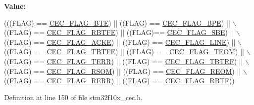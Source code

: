 {\bfseries Value\+:}
\begin{DoxyCode}
(((FLAG) == \hyperlink{group___c_e_c__flags__definition_ga66e91438a7df5d00db3c5410d8f7d456}{CEC\_FLAG\_BTE}) || ((FLAG) == \hyperlink{group___c_e_c__flags__definition_gaf2a5d5dcbc57fc0cf7cfa988533a2a09}{CEC\_FLAG\_BPE}) || \(\backslash\)
                               ((FLAG) == \hyperlink{group___c_e_c__flags__definition_gafdfca815014dee4a458083337795c336}{CEC\_FLAG\_RBTFE}) || ((FLAG)== 
      \hyperlink{group___c_e_c__flags__definition_gac77db62c05af2462ed3f1b64cef2e136}{CEC\_FLAG\_SBE}) || \(\backslash\)
                               ((FLAG) == \hyperlink{group___c_e_c__flags__definition_ga1583b7a221e54f2f19cb121bf310547c}{CEC\_FLAG\_ACKE}) || ((FLAG) == 
      \hyperlink{group___c_e_c__flags__definition_gaf751970725df12976dc6c8356910143a}{CEC\_FLAG\_LINE}) || \(\backslash\)
                               ((FLAG) == \hyperlink{group___c_e_c__flags__definition_gaae90fd2f95085e113b6943bb35d899ba}{CEC\_FLAG\_TBTFE}) || ((FLAG) == 
      \hyperlink{group___c_e_c__flags__definition_gad0adfb11294f562f2c8dc555f69e25e0}{CEC\_FLAG\_TEOM}) || \(\backslash\)
                               ((FLAG) == \hyperlink{group___c_e_c__flags__definition_ga7edc608ca7b4ea74dd4d795fa3214c11}{CEC\_FLAG\_TERR}) || ((FLAG) == 
      \hyperlink{group___c_e_c__flags__definition_gaeb02634fdd06f4ea0990e2cf23cf200e}{CEC\_FLAG\_TBTRF}) || \(\backslash\)
                               ((FLAG) == \hyperlink{group___c_e_c__flags__definition_ga4e352d4f48e3b197edf150860703d2bf}{CEC\_FLAG\_RSOM}) || ((FLAG) == 
      \hyperlink{group___c_e_c__flags__definition_gaffeaec4eafbf1efbd88139b9bb0654a7}{CEC\_FLAG\_REOM}) || \(\backslash\)
                               ((FLAG) == \hyperlink{group___c_e_c__flags__definition_gac2376c2b958536ab414574f60cb5d75a}{CEC\_FLAG\_RERR}) || ((FLAG) == 
      \hyperlink{group___c_e_c__flags__definition_gae73c6ec73ab8ad57b18d3bd416baf2d3}{CEC\_FLAG\_RBTF}))
\end{DoxyCode}


Definition at line 150 of file stm32f10x\+\_\+cec.\+h.

